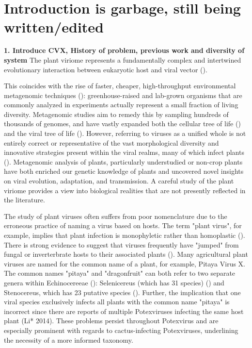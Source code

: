 \documentclass{article}
\begin{document}
\twocolumn

\section*{Introduction is garbage, 
\newline still being written/edited}
\textbf{1. Introduce CVX, History of problem, previous work and diversity of system}
The plant viriome represents a fundamentally complex and intertwined evolutionary interaction between eukaryotic host and viral vector (\cite{delwart_viral_2007}).

 This coincides with the rise of faster, cheaper, high-throughput environmental metagenomic techniques (\cite{delwart_viral_2007, lefeuvre_evolution_2019, schulz_towards_2017}): greenhouse-raised and lab-grown organisms that are commonly analyzed in experiments actually represent a small fraction of living diversity. Metagenomic studies aim to remedy this by sampling hundreds of thousands of genomes, and have vastly expanded both the cellular tree of life (\cite{schulz_towards_2017, hug_new_2016}) and the viral tree of life (\cite{gregory_marine_2019, lefeuvre_evolution_2019, shi_redefining_2016}).  However, referring to viruses as a unified whole is not entirely correct or representative of the vast morphological diversity and innovative strategies present within the viral realms, many of which infect plants (\cite{delwart_viral_2007, lefeuvre_evolution_2019}). Metagenomic analysis of plants, particularly understudied or non-crop plants have both enriched our genetic knowledge of plants and uncovered novel insights on viral evolution, adaptation, and transmission. A careful study of the plant viriome provides a view into biological realities that are not presently reflected in the literature.



The study of plant viruses often suffers from poor nomenclature due to the erroneous practice of naming a virus based on hosts. The term "plant virus", for example, implies that plant infection is monophyletic rather than homoplastic (\cite{lefeuvre_evolution_2019}). There is strong evidence to suggest that viruses frequently have "jumped" from fungal or inverterbrate hosts to their associated plants (\cite{lefeuvre_evolution_2019}). Many agricultural plant viruses are named for the common name of a plant, for example, Pitaya Virus X. The common names "pitaya" and "dragonfruit" can both refer to two separate genera within Echinocereeae (\cite{le_bellec_12_2011}): Selenicereus (which has 31 species) (\cite{korotkova_phylogenetic_2017, guerrero_phylogenetic_2019}) and Stenocereus, which has 23 putative species (\cite{guerrero_phylogenetic_2019}). Further, the implication that one viral species exclusively infects all plants with the common name "pitaya" is incorrect since there are reports of multiple Potexviruses infecting the same host plant (Li* 2014). These problems persist throughout Potexvirus and are especially prominent with regards to cactus-infecting Potexviruses, underlining the necessity of a more informed taxonomy.
\end{document}
